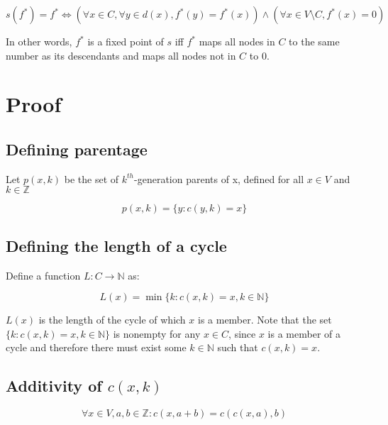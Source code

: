 \documentclass[11pt]{article}
\begin{document}
    \begin{equation}
        s(f^*) = f^* \Leftrightarrow (\forall x\in C, \forall y\in d(x), f^*(y) = f^*(x) ) \land (\forall x\in V\setminus C, f^*(x) = 0)
    \end{equation}

    In other words, $f^*$ is a fixed point of $s$ iff $f^*$ maps all nodes in $C$ to the same number as its descendants and maps all nodes not in $C$ to $0$.

    \section{Proof}

    \subsection{Defining parentage}

    Let $p(x,k)$ be the set of $k^{th}$-generation parents of x, defined for all $x \in V$ and $k \in \mathbb{Z}$

    \begin{equation}
        p(x,k) = \{y: c(y,k) = x\}
    \end{equation}

    \subsection{Defining the length of a cycle}

    Define a function $L: C \rightarrow \mathbb{N}$ as:

    \begin{equation}
        L(x) = \min\{k : c(x,k) = x, k \in \mathbb{N}\}
    \end{equation}

    $L(x)$ is the length of the cycle of which $x$ is a member. Note that the set $\{k : c(x,k) = x, k \in \mathbb{N}\}$ is nonempty for any $x \in C$, since $x$ is a member of a cycle and therefore there must exist some $k \in \mathbb{N}$ such that $c(x,k) = x$.

    \subsection{Additivity of $c(x,k)$}

    \begin{equation}
        \forall x \in V, a,b \in \mathbb{Z}: c(x, a+b) = c(c(x,a),b)
    \end{equation}
\end{document}

